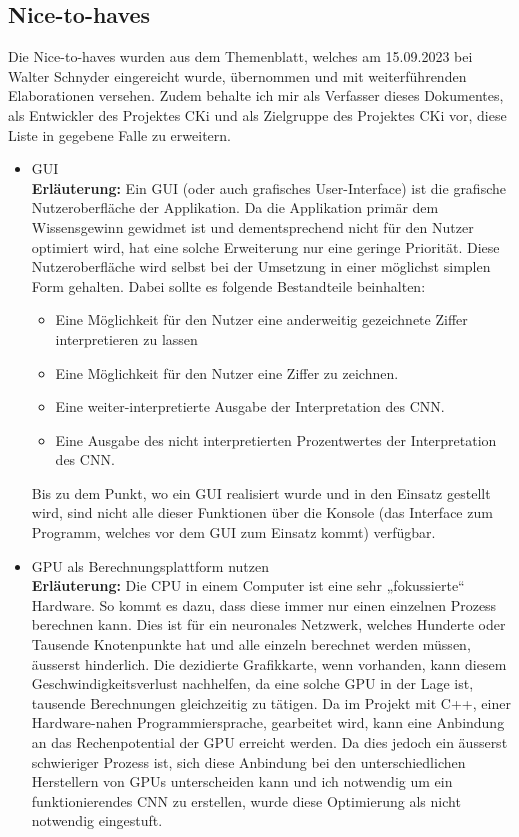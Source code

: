 \begin{itemize}
\end{itemize}

\subsection{Nice-to-haves}
\label{sec:AnalyseNiceToHaveS}
Die Nice-to-haves wurden aus dem Themenblatt, welches am 15.09.2023 bei Walter Schnyder eingereicht wurde, übernommen und mit weiterführenden Elaborationen versehen. Zudem behalte ich mir als Verfasser dieses Dokumentes, als Entwickler des Projektes CKi und als Zielgruppe des Projektes CKi vor, diese Liste in gegebene Falle zu erweitern.

\begin{itemize}
	\item GUI
	\\
	\textbf{Erläuterung:}
	Ein GUI (oder auch grafisches User-Interface) ist die grafische Nutzeroberfläche der Applikation. Da die Applikation primär dem Wissensgewinn gewidmet ist und dementsprechend nicht für den Nutzer optimiert wird, hat eine solche Erweiterung nur eine geringe Priorität. Diese Nutzeroberfläche wird selbst bei der Umsetzung in einer möglichst simplen Form gehalten. Dabei sollte es folgende Bestandteile beinhalten:
	\begin{itemize}
		\item Eine Möglichkeit für den Nutzer eine anderweitig gezeichnete Ziffer interpretieren zu lassen
		\item Eine Möglichkeit für den Nutzer eine Ziffer zu zeichnen.
		\item Eine weiter-interpretierte Ausgabe der Interpretation des CNN.
		\item Eine Ausgabe des nicht interpretierten Prozentwertes der Interpretation des CNN.
	\end{itemize}
	Bis zu dem Punkt, wo ein GUI realisiert wurde und in den Einsatz gestellt wird, sind nicht alle dieser Funktionen über die Konsole (das Interface zum Programm, welches vor dem GUI zum Einsatz kommt) verfügbar.
	
	\item GPU als Berechnungsplattform nutzen
	\\
	\textbf{Erläuterung:}
	Die CPU in einem Computer ist eine sehr „fokussierte“ Hardware. So kommt es dazu, dass diese immer nur einen einzelnen Prozess berechnen kann. Dies ist für ein neuronales Netzwerk, welches Hunderte oder Tausende Knotenpunkte hat und alle einzeln berechnet werden müssen, äusserst hinderlich. Die dezidierte Grafikkarte, wenn vorhanden, kann diesem Geschwindigkeitsverlust nachhelfen, da eine solche GPU in der Lage ist, tausende Berechnungen gleichzeitig zu tätigen.
	Da im Projekt mit C++, einer Hardware-nahen Programmiersprache, gearbeitet wird, kann eine Anbindung an das Rechenpotential der GPU erreicht werden. Da dies jedoch ein äusserst schwieriger Prozess ist, sich diese Anbindung bei den unterschiedlichen Herstellern von GPUs unterscheiden kann und ich notwendig um ein funktionierendes CNN zu erstellen, wurde diese Optimierung als nicht notwendig eingestuft.
\end{itemize}

